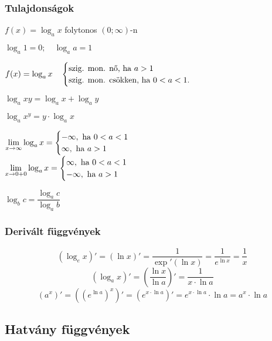 \documentclass[a4paper,12pt,twoside]{book}
\theoremstyle{break}
\theoremstyle{plain}
\begin{document}
\subsubsection{Tulajdonságok}
\begin{enumerate*}
 \item $f(x) = \log_a x$ folytonos $(0;\infty)$-n
 \item $\log_a 1 = 0; \quad \log_a a = 1$
 \item $f(x) = \log_a x \quad \begin{cases}
                           \hbox{szig. mon. nő, ha } a>1\\
			   \hbox{szig. mon. csökken, ha } 0<a<1.
                         \end{cases}$
 \item $\log_a xy = \log_a x + \log_a y$
 \item $\log_a x^y = y\cdot\log_a x$
 \item $\displaystyle \lim_{x\to \infty} \log_a x =
  \begin{cases}
    -\infty, \hbox{ ha } 0<a<1\\
    \infty, \hbox{ ha } a>1
  \end{cases}$\\
  $\displaystyle \lim_{x\to 0+0} \log_a x =
  \begin{cases}
    \infty, \hbox{ ha } 0<a<1\\
    -\infty, \hbox{ ha } a>1
  \end{cases}$
 \item $\log_b c = \dfrac{\log_a c}{\log_a b}$
\end{enumerate*}

\subsubsection{Derivált függvények}
\[(\log_e x)' = (\ln x)' = \frac{1}{\exp'(\ln x)} = \frac{1}{e^{\ln x}} = \frac{1}{x}\]
\[(\log_a x)' = \left(\frac{\ln x}{\ln a}\right)' = \frac{1}{x\cdot \ln a}\]
\[(a^x)' = ((e^{\ln a})^x)' = (e^{x\cdot \ln a})' = e^{x\cdot\ln a}\cdot \ln a = a^x\cdot \ln a\]

\subsection{Hatvány függvények}
\end{document}
